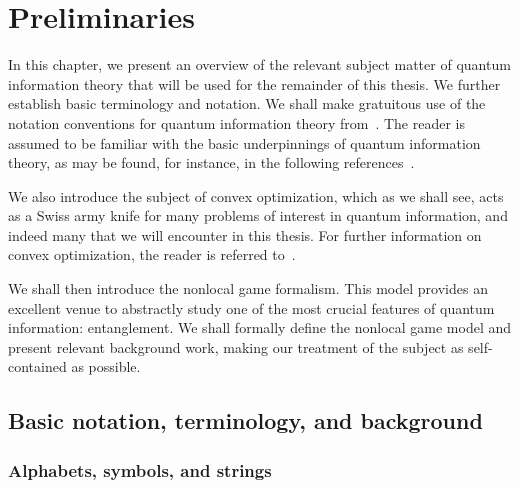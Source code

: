 \chapter{Preliminaries}
\label{chap:preliminaries}

In this chapter, we present an overview of the relevant subject matter of quantum information theory that will be used for the remainder of this thesis. We further establish basic terminology and notation. We shall make gratuitous use of the notation conventions for quantum information theory from~\cite{Watrous2015}. The reader is assumed to be familiar with the basic underpinnings of quantum information theory, as may be found, for instance, in the following references~\cite{Nielsen2001,Kaye2007,Wilde2013}.

We also introduce the subject of convex optimization, which as we shall see, acts as a Swiss army knife for many problems of interest in quantum information, and indeed many that we will encounter in this thesis. For further information on convex optimization, the reader is referred to~\cite{Boyd2004}. 

We shall then introduce the nonlocal game formalism. This model provides an excellent venue to abstractly study one of the most crucial features of quantum information: entanglement. We shall formally define the nonlocal game model and present relevant background work, making our treatment of the subject as self-contained as possible. 

\minitoc

\section{Basic notation, terminology, and background} 

\subsection{Alphabets, symbols, and strings}

